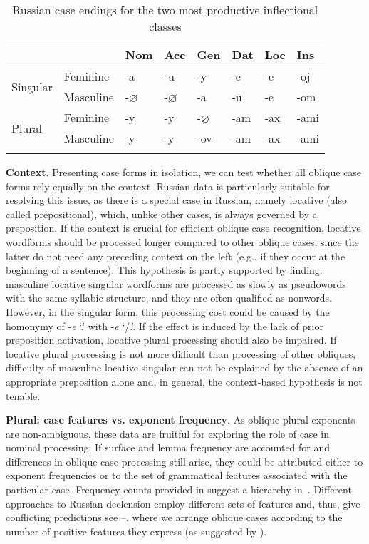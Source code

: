 \documentclass[output=paper, modfonts,newtxmath,hidelinks]{langscibook}
\begin{document}
\begin{table}
    \centering
	\caption{Russian case endings for the two most productive inflectional classes}
    \label{tab:rusDecl}
	\begin{tabular}{*{8}l}
		\lsptoprule
        ~	&	~	&	Nom    &	Acc	 & Gen  &	Dat &	Loc &	Ins	\\
        \midrule
		\multirow{2}{*}{Singular} & Feminine	&	-a  &	-u	&	-y	&	-e	& -e    &	-oj\\
		&	Masculine			&	-$\varnothing$  & -$\varnothing$    &	-a	&	-u	&   -e  &	-om	\\
        \midrule
        \multirow{2}{*}{Plural} & Feminine	& -y    & -y    &	-$\varnothing$ & -am  & -ax & -ami \\
        &	Masculine & -y  & -y &	-ov & -am    & -ax & -ami\\
		\lspbottomrule
    \end{tabular}
\end{table}

\textbf{Context}. Presenting case forms in isolation, we can test whether all oblique case forms  rely equally on the context. Russian data is particularly suitable for resolving this issue, as there is a special case in Russian, namely locative (also called prepositional), which, unlike other cases, is always governed by a preposition. If the context is crucial for efficient oblique case recognition, locative wordforms should be processed longer compared to other oblique cases, since the latter do not need any preceding context on the left (e.g., if they occur at the beginning of a sentence). This hypothesis is partly supported by  finding: masculine locative singular wordforms are processed as slowly as pseudowords with the same syllabic structure, and they are often qualified as nonwords. However, in the singular form, this processing cost could be caused by the homonymy of -\textit{e} `\locc.\masc' with  -\textit{e} `\datt/\locc.\fem'. If the effect is induced by the lack of prior preposition activation, locative plural processing should also be impaired. If locative plural processing is not more difficult than processing of other obliques, difficulty of masculine locative singular can not be explained by the absence of an appropriate preposition alone and, in general, the context-based hypothesis is not tenable. 

\textbf{Plural: case features vs. exponent frequency}. As oblique plural exponents are non-ambiguous, these data are fruitful for exploring the role of case in nominal processing. If surface and lemma frequency are accounted for and differences in oblique case processing still arise, they could be attributed either to exponent frequencies or to the set of grammatical features associated with the particular case. Frequency counts provided in \citet{samojlova2014frequencies} suggest a hierarchy in~. Different approaches to Russian declension employ different sets of features and, thus, give conflicting predictions see --, where we arrange oblique cases according to the number of positive features they express (as suggested by \citealt{clahsen2001mental}).
\end{document}
